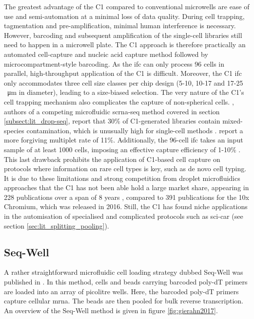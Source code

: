 The greatest advantage of the C1 compared to conventional microwells are ease of use and semi-automation at a minimal loss of data quality. During cell trapping, tagmentation and pre-amplification, minimal human interference is necessary. However, barcoding and subsequent amplification of the single-cell libraries still need to happen in a microwell plate. The C1 approach is therefore practically an automated cell-capture and nucleic acid capture method followed by microcompartment-style barcoding. As the \acrshort{ifc} can only process 96 cells in parallel, high-throughput application of the C1 is difficult. Moreover, the C1 \acrshort{ifc} only accommodates three cell size classes per chip design (5-10, 10-17 and 17-25 \SI{}{\um} in diameter), leading to a size-biased selection. The very nature of the C1's cell trapping mechanism also complicates the capture of non-spherical cells. \citeauthor{macosko2015}, authors of a competing microfluidic \acrshort{scrna-seq} method covered in section \ref{subsect:lit_drop-seq}, report that 30\% of C1-generated libraries contain mixed-species contamination, which is unusually high for single-cell methods \citep{macosko2015}. \citeauthor{shalek2014} report a more forgiving multiplet rate of 11\%. Additionally, the 96-cell \acrshort{ifc} takes an input sample of at least 1000 cells, imposing an effective capture efficiency of 1-10\% \citep{zilionis2017}. This last drawback prohibits the application of C1-based cell capture on protocols where information on rare cell types is key, such as de novo cell typing. It is due to these limitations and strong competition from droplet microfluidics approaches that the C1 has not been able hold a large market share, appearing in 228 publications over a span of 8 years \citep{fluidigmwebsite2019}, compared to 391 publications for the 10x Chromium, which was released in 2016. Still, the C1 has found niche applications in the automisation of specialised and complicated protocols such as \acrshort{sci-car} (see section \ref{sec:lit_splitting_pooling}).\pms


\subsection{Seq-Well}
\label{subsect:lit_seq-well}
A rather straightforward microfluidic cell loading strategy dubbed Seq-Well was published in \citeyear{gierahn2017} \citep{gierahn2017}. In this method, cells and beads carrying barcoded poly-dT primers are loaded into an array of picolitre wells. Here, the barcoded poly-dT primers capture cellular \acrshort{mrna}. The beads are then pooled for bulk reverse transcription. An overview of the Seq-Well method is given in figure \ref{fig:gierahn2017}.\pms


